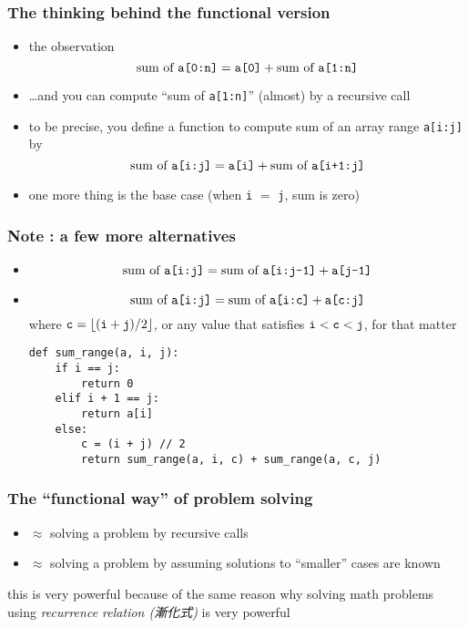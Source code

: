 \documentclass[12pt,dvipdfmx]{beamer}
\newcommand{\ao}[1]{{\color{blue}#1}}
\begin{document}
\begin{frame}[fragile]
  \frametitle{The thinking behind the functional version}
  \begin{itemize}
  \item the observation
    \[ \mbox{sum of {\tt a[0:n]}} = \mbox{\tt a[0]} + \mbox{sum of {\tt a[1:n]}} \]
  \item \ldots and you can compute ``sum of {\tt a[1:n]}'' (almost) by a recursive call
  \item to be precise, you define a function to compute sum of an array range {\tt a[i:j]} by
    \[ \mbox{sum of {\tt a[i:j]}} = \mbox{\tt a[i]} + \mbox{sum of {\tt a[i+1:j]}} \]
  \item one more thing is the base case (when {\tt i} $=$ {\tt j}, sum is zero)
  \end{itemize}
\end{frame}

\begin{frame}[fragile]
  \frametitle{Note : a few more alternatives}
  \begin{itemize}
  \item 
    \[ \mbox{sum of {\tt a[i:j]}} = \mbox{sum of {\tt a[i:j-1]}} + \mbox{\tt a[j-1]} \]
  \item 
    \[ \mbox{sum of {\tt a[i:j]}} = \mbox{sum of {\tt a[i:c]}} + \mbox{\tt a[c:j]} \]
    where ${\tt c} = \left\lfloor ({\tt i} + {\tt j}) / 2 \right\rfloor$,
    or any value that satisfies ${\tt i} < {\tt c} < {\tt j}$, for that matter

\begin{lstlisting}
def sum_range(a, i, j):
    if i == j:
        return 0
    elif i + 1 == j:
        return a[i]
    else:
        c = (i + j) // 2
        return sum_range(a, i, c) + sum_range(a, c, j)
\end{lstlisting}
  \end{itemize}
\end{frame}

\begin{frame}
  \frametitle{The ``functional way'' of problem solving}
  \begin{itemize}
  \item $\approx$ solving a problem by recursive calls
  \item $\approx$ solving a problem by assuming solutions to ``smaller'' cases are known
  \end{itemize}

  this is very powerful because of the same reason why solving math problems
  using \ao{\it recurrence relation (漸化式)} is very powerful
\end{frame}
\end{document}
